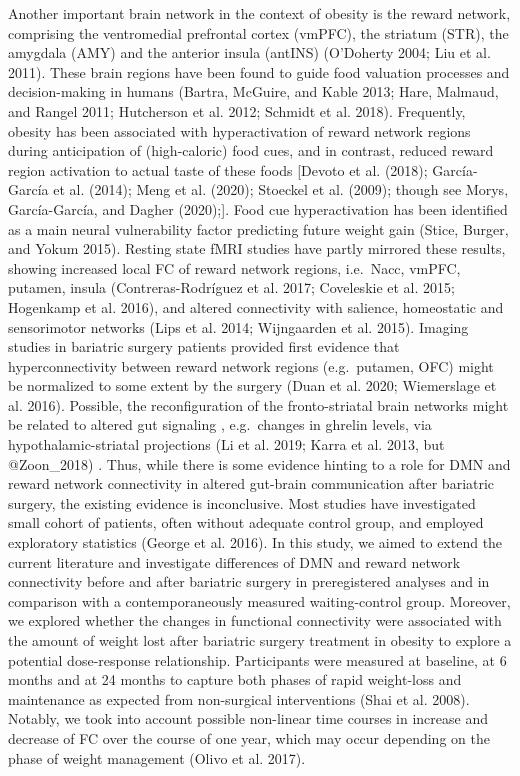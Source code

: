 \documentclass[
]{article}
\begin{document}
Another important brain network in the context of obesity is the reward network, comprising the ventromedial prefrontal cortex (vmPFC), the striatum (STR), the amygdala (AMY) and the anterior insula (antINS) (O'Doherty 2004; Liu et al. 2011). These brain regions have been found to guide food valuation processes and decision-making in humans (Bartra, McGuire, and Kable 2013; Hare, Malmaud, and Rangel 2011; Hutcherson et al. 2012; Schmidt et al. 2018). Frequently, obesity has been associated with hyperactivation of reward network regions during anticipation of (high-caloric) food cues, and in contrast, reduced reward region activation to actual taste of these foods {[}Devoto et al. (2018); García-García et al. (2014); Meng et al. (2020); Stoeckel et al. (2009); though see Morys, García-García, and Dagher (2020);{]}. Food cue hyperactivation has been identified as a main neural vulnerability factor predicting future weight gain (Stice, Burger, and Yokum 2015). Resting state fMRI studies have partly mirrored these results, showing increased local FC of reward network regions, i.e.~Nacc, vmPFC, putamen, insula (Contreras-Rodríguez et al. 2017; Coveleskie et al. 2015; Hogenkamp et al. 2016), and altered connectivity with salience, homeostatic and sensorimotor networks (Lips et al. 2014; Wijngaarden et al. 2015). Imaging studies in bariatric surgery patients provided first evidence that hyperconnectivity between reward network regions (e.g.~putamen, OFC) might be normalized to some extent by the surgery (Duan et al. 2020; Wiemerslage et al. 2016). Possible, the reconfiguration of the fronto-striatal brain networks might be related to altered gut signaling , e.g.~changes in ghrelin levels, via hypothalamic-striatal projections (Li et al. 2019; Karra et al. 2013, but @Zoon\_2018) .
Thus, while there is some evidence hinting to a role for DMN and reward network connectivity in altered gut-brain communication after bariatric surgery, the existing evidence is inconclusive. Most studies have investigated small cohort of patients, often without adequate control group, and employed exploratory statistics (George et al. 2016).
In this study, we aimed to extend the current literature and investigate differences of DMN and reward network connectivity before and after bariatric surgery in preregistered analyses and in comparison with a contemporaneously measured waiting-control group. Moreover, we explored whether the changes in functional connectivity were associated with the amount of weight lost after bariatric surgery treatment in obesity to explore a potential dose-response relationship.
Participants were measured at baseline, at 6 months and at 24 months to capture both phases of rapid weight-loss and maintenance as expected from non-surgical interventions (Shai et al. 2008). Notably, we took into account possible non-linear time courses in increase and decrease of FC over the course of one year, which may occur depending on the phase of weight management (Olivo et al. 2017).
\end{document}

